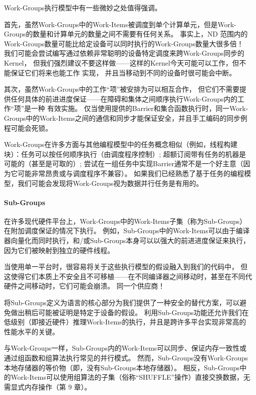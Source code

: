 Work-Groups执行模型中有一些微妙之处值得强调。

首先，虽然Work-Groups中的Work-Items被调度到单个计算单元，但是Work-Groups的数量和计算单元的数量之间不需要有任何关系。 
事实上，ND 范围内的Work-Groups数量可能比给定设备可以同时执行的Work-Groups数量大很多倍！ 
我们可能会尝试编写通过依赖非常聪明的设备特定调度来跨Work-Groups同步的Kernel，
但我们强烈建议不要这样做——这样的Kernel今天可能可以工作，但不能保证它们将来也能工作 实现，
并且当移动到不同的设备时很可能会中断。

其次，虽然Work-Groups中的工作“项”被安排为可以相互合作，
但它们不需要提供任何具体的前进进度保证——在障碍和集体之间顺序执行Work-Groups内的工作“项”是一种 有效实施。 
仅当使用提供的Barrier和集合函数执行时，同一Work-Groups中的Work-Items之间的通信和同步才能保证安全，并且手工编码的同步例程可能会死锁。

\begin{remark}
	Work-Groups在许多方面与其他编程模型中的任务概念相似（例如，线程构建块）：任务可以按任何顺序执行（由调度程序控制）;
	超额订阅带有任务的机器是可能的（甚至是可取的）;
	尝试在一组任务中实现Barrier通常不是一个好主意（因为它可能非常昂贵或与调度程序不兼容）。
	如果我们已经熟悉了基于任务的编程模型，我们可能会发现将Work-Groups视为数据并行任务是有用的。
\end{remark}

\paragraph{Sub-Groups}

在许多现代硬件平台上，Work-Groups中的Work-Items子集（称为Sub-Groups）在附加调度保证的情况下执行。 
例如，Sub-Groups中的Work-Items可以由于编译器向量化而同时执行，和/或Sub-Groups本身可以以强大的前进进度保证来执行，
因为它们被映射到独立的硬件线程。

当使用单一平台时，很容易将关于这些执行模型的假设融入到我们的代码中，
但这使得它们本质上不安全且不可移植——在不同编译器之间移动时，甚至在不同代硬件之间移动时，它们可能会崩溃。 同一个供应商！

将Sub-Groups定义为语言的核心部分为我们提供了一种安全的替代方案，可以避免做出稍后可能被证明是特定于设备的假设。 
利用Sub-Groups功能还允许我们在低级别（即接近硬件）推理Work-Items的执行，并且是跨许多平台实现非常高的性能水平的关键。

与Work-Groups一样，Sub-Groups内的Work-Items可以同步、保证内存一致性或通过组函数和组算法执行常见的并行模式。 
然而，Sub-Groups没有Work-Groups本地存储器的等价物（即，没有Sub-Groups本地存储器）。 
相反，Sub-Groups中的Work-Items可以使用组算法的子集（俗称“SHUFFLE”操作）直接交换数据，无需显式内存操作（第 9 章）。

